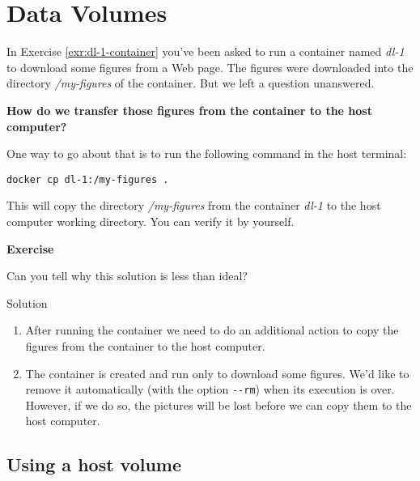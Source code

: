\documentclass[
]{article}
\newenvironment{infobox}[1]
  {
  \begin{itemize}
  \renewcommand{\labelitemi}{
    \raisebox{-.7\height}[0pt][0pt]{
      
    }
  }
  \setlength{\fboxsep}{1em}
  \begin{whitebox}
  \item
  }
  {
  \end{whitebox}
  \end{itemize}
  }
\theoremstyle{definition}
\theoremstyle{definition}
\theoremstyle{definition}
\theoremstyle{remark}
\let\BeginKnitrBlock\begin \let\EndKnitrBlock\end
\begin{document}
\hypertarget{data-volumes}{%
\section{Data Volumes}\label{data-volumes}}

In Exercise \ref{exr:dl-1-container} you've been asked to run a container named
\emph{dl-1} to download some figures from a Web page.
The figures were downloaded into the
directory \emph{/my-figures} of the container.
But we left a question unanswered.

\textbf{How do we transfer those figures from the container to the host computer?}

One way to go about that is to run the following command in the host terminal:

\begin{verbatim}
docker cp dl-1:/my-figures .
\end{verbatim}

This will copy the directory \emph{/my-figures} from the container \emph{dl-1} to
the host computer working directory.
You can verify it by yourself.

\begin{infobox}{exercisebox}

\textbf{Exercise}

\BeginKnitrBlock{exercise}
\protect\hypertarget{exr:unnamed-chunk-25}{}{\label{exr:unnamed-chunk-25} }Can you tell why this solution is less than ideal?
\EndKnitrBlock{exercise}

\end{infobox}

Solution

\begin{infobox}{exercisebox}

\begin{enumerate}
\def\labelenumi{\arabic{enumi}.}
\item
  After running the container we need to do an additional action to copy
  the figures from the container to the host computer.
\item
  The container is created and run only to download some figures.
  We'd like to remove it automatically (with the option \texttt{-\/-rm}) when its
  execution is over. However, if we do so, the pictures will be lost before
  we can copy them to the host computer.
\end{enumerate}

\end{infobox}

\hypertarget{using-a-host-volume}{%
\subsection{Using a host volume}\label{using-a-host-volume}}
\end{document}
